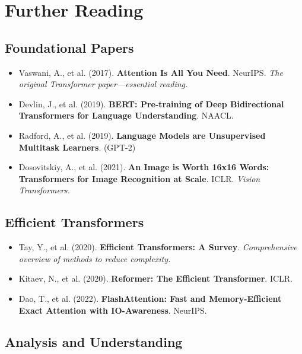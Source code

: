 \documentclass{article}
\begin{document}
\section{Further Reading}

\subsection{Foundational Papers}

\begin{itemize}
\item Vaswani, A., et al. (2017). \textbf{Attention Is All You Need}. NeurIPS. \textit{The original Transformer paper---essential reading.}

\item Devlin, J., et al. (2019). \textbf{BERT: Pre-training of Deep Bidirectional Transformers for Language Understanding}. NAACL.

\item Radford, A., et al. (2019). \textbf{Language Models are Unsupervised Multitask Learners}. (GPT-2)

\item Dosovitskiy, A., et al. (2021). \textbf{An Image is Worth 16x16 Words: Transformers for Image Recognition at Scale}. ICLR. \textit{Vision Transformers.}
\end{itemize}

\subsection{Efficient Transformers}

\begin{itemize}
\item Tay, Y., et al. (2020). \textbf{Efficient Transformers: A Survey}. \textit{Comprehensive overview of methods to reduce complexity.}

\item Kitaev, N., et al. (2020). \textbf{Reformer: The Efficient Transformer}. ICLR.

\item Dao, T., et al. (2022). \textbf{FlashAttention: Fast and Memory-Efficient Exact Attention with IO-Awareness}. NeurIPS.
\end{itemize}

\subsection{Analysis and Understanding}
\end{document}
